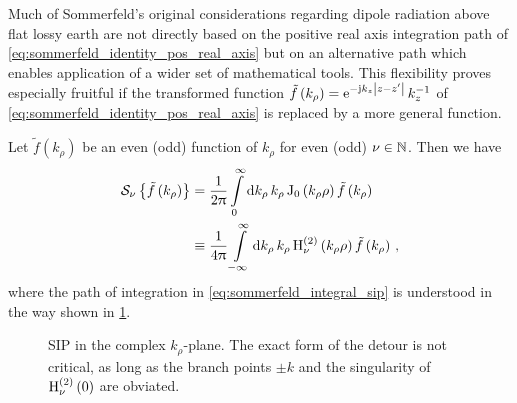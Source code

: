 Much of Sommerfeld's original considerations
\cite{Sommerfeld1909,Sommerfeld1926} regarding dipole radiation above flat
lossy earth are not directly based on the positive real axis integration path
of \eqref{eq:sommerfeld_identity_pos_real_axis} but on an alternative path
which enables application of a wider set of mathematical tools.
This flexibility proves especially fruitful if the transformed function
$\tilde{f} \left(k_\rho\right) = \mathrm{e}^{-\mathrm{j} k_z \left\vert z - z^\prime\right\vert}\, k_z^{-1}$ of
\eqref{eq:sommerfeld_identity_pos_real_axis} is replaced by a more general
function.
\begin{corollary}
	Let $\tilde{f} \left(k_\rho\right)$ be an even (odd) function of $k_\rho$
	for even (odd) $\nu \in \mathbb{N}$.
	Then we have
	\begin{align}
		\mathcal{S}_{\nu} \left\{\tilde{f} \left( k_\rho \right) \right\}
		&=
		\frac{1}{2\uppi}
		\int\limits_{0}^{\infty} \mathrm{d} k_\rho \, k_\rho
		\operatorname{J}_{0} \left(k_\rho \rho\right)
		\tilde{f} \left(k_\rho\right) 
		\label{eq:sommerfeld_integral_real_axis_path}
		\\
		&\equiv
		\frac{1}{4\uppi}
		\int\limits_{-\infty}^{\infty} \mathrm{d} k_\rho \, k_\rho
		\operatorname{H}_{\nu}^{\left( 2 \right)} \left(k_\rho \rho\right)
		\tilde{f} \left(k_\rho\right)
		\label{eq:sommerfeld_integral_sip}
		\, ,
	\end{align}
	where the path of integration in \eqref{eq:sommerfeld_integral_sip} is
	understood in the way shown in \cref{fig:sip}.
\end{corollary}
	
\begin{figure}
	\centering
	\caption[\acl{SIP} in the complex $k_\rho$-plane]
	{\acf{SIP} in the complex $k_\rho$-plane. The exact form of the detour
	is not critical, as long as the branch points $\pm k$ and the singularity
	of $\operatorname{H}_{\nu}^{\left( 2 \right)} \left(0\right)$ are obviated.}
	\label{fig:sip}
\end{figure}


